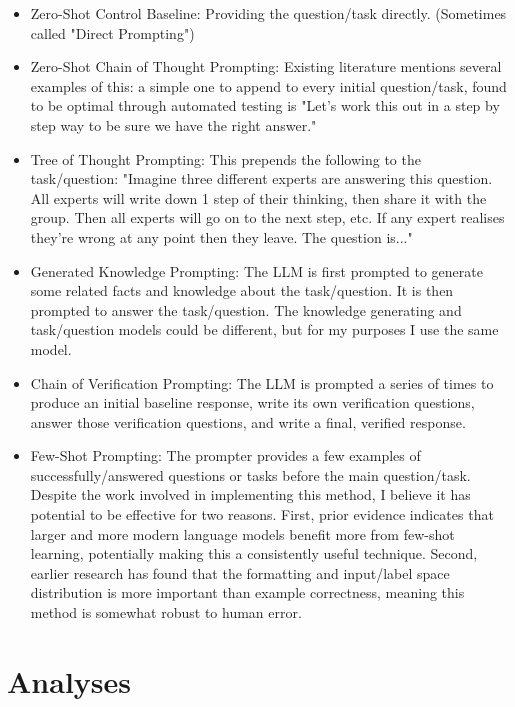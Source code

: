 \documentclass[11pt]{article}
\begin{document}
\begin{itemize}
  \item Zero-Shot Control Baseline: Providing the question/task directly. (Sometimes called "Direct Prompting")
  \item Zero-Shot Chain of Thought Prompting: Existing literature mentions several examples of this: a simple one to append to every initial question/task, found to be optimal through automated testing is "Let's work this out in a step by step way to be sure we have the right answer." \cite{hebenstreit_automatically_2023, zhou_large_2022}
  \item Tree of Thought Prompting: This prepends the following to the task/question: "Imagine three different experts are answering this question. All experts will write down 1 step of their thinking, then share it with the group. Then all experts will go on to the next step, etc. If any expert realises they're wrong at any point then they leave. The question is..." \cite{hulbert_using_2023}
  \item Generated Knowledge Prompting: The LLM is first prompted to generate some related facts and knowledge about the task/question. It is then prompted to answer the task/question. \cite{liu_generated_2022} The knowledge generating and task/question models could be different, but for my purposes I use the same model.
  \item Chain of Verification Prompting: The LLM is prompted a series of times to produce an initial baseline response, write its own verification questions, answer those verification questions, and write a final, verified response. \cite{dhuliawala_chain--verification_2023}
  \item Few-Shot Prompting: The prompter provides a few examples of successfully/answered questions or tasks before the main question/task. Despite the work involved in implementing this method, I believe it has potential to be effective for two reasons. First, prior evidence indicates that larger and more modern language models benefit more from few-shot learning, potentially making this a consistently useful technique. \cite{brown_language_2020} Second, earlier research has found that the formatting and input/label space distribution is more important than example correctness, meaning this method is somewhat robust to human error. \cite{min_rethinking_2022}
\end{itemize}

\section*{Analyses}
\end{document}
